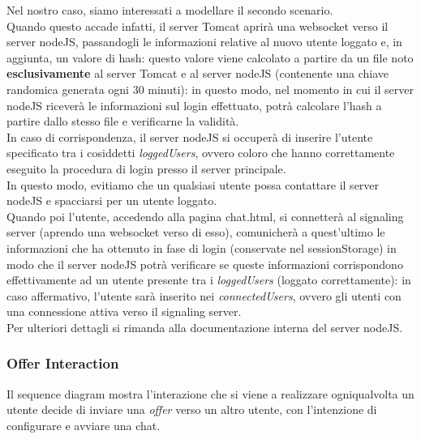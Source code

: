 Nel nostro caso, siamo interessati a modellare il secondo scenario.\\
Quando questo accade infatti, il server Tomcat aprirà una websocket verso il server nodeJS, passandogli le informazioni relative al nuovo utente loggato e, in aggiunta, un valore di hash: questo valore viene calcolato a partire da un file noto \textbf{esclusivamente} al server Tomcat e al server nodeJS (contenente una chiave randomica generata ogni 30 minuti): in questo modo, nel momento in cui il server nodeJS riceverà le informazioni sul login effettuato, potrà calcolare l'hash a partire dallo stesso file e verificarne la validità.\\
In caso di corrispondenza, il server nodeJS si occuperà di inserire l'utente specificato tra i cosiddetti \textit{loggedUsers}, ovvero coloro che hanno correttamente eseguito la procedura di login presso il server principale.\\
In questo modo, evitiamo che un qualsiasi utente possa contattare il server nodeJS e spacciarsi per un utente loggato.\\
Quando poi l'utente, accedendo alla pagina chat.html, si connetterà al signaling server (aprendo una websocket verso di esso), comunicherà a quest'ultimo le informazioni che ha ottenuto in fase di login (conservate nel sessionStorage) in modo che il server nodeJS potrà verificare se queste informazioni corrispondono effettivamente ad un utente presente tra i \textit{loggedUsers} (loggato correttamente): in caso affermativo, l'utente sarà inserito nei \textit{connectedUsers}, ovvero gli utenti con una connessione attiva verso il signaling server.\\
Per ulteriori dettagli si rimanda alla documentazione interna del server nodeJS.\\



\subsubsection{Offer Interaction}

Il sequence diagram mostra l'interazione che si viene a realizzare ogniqualvolta un utente decide di inviare una \textit{offer} verso un altro utente, con l'intenzione di configurare e avviare una chat.\\

